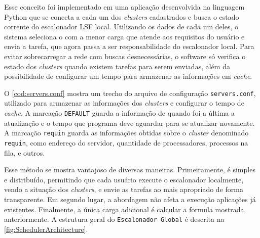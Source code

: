\documentclass[12pt]{report} %
\begin{document}
	    Esse conceito foi implementado em uma aplicação desenvolvida na linguagem Python que se conecta a cada um dos \textit{clusters} cadastrados e busca o estado corrente do escalonador LSF local.
	    Utilizando os dados de cada um deles, o sistema seleciona o com a menor carga que atende aos requisitos do usuário e envia a tarefa, que agora passa a ser responsabilidade do escalonador local.
	    Para evitar sobrecarregar a rede com buscas desnecessárias, o software só verifica o estado dos \textit{clusters} quando existem tarefas para serem enviadas, além da possibilidade de configurar um tempo para armazenar as informações em \textit{cache}.
	    
	    O \autoref{cod:servers.conf} mostra um trecho do arquivo de configuração \texttt{servers.conf}, utilizado para armazenar as informações dos \textit{clusters} e configurar o tempo de \textit{cache}. A marcação \texttt{DEFAULT} guarda a informação de quando foi a última a atualização e o tempo que programa deve aguardar para se atualizar novamente. A marcação \texttt{requin} guarda as informações obtidas sobre o \textit{cluster} denominado \texttt{requin}, como endereço do servidor, quantidade de processadores, processos na fila, e outros.
	    
 		

	    Esse método se mostra vantajoso de diversas maneiras.
	    Primeiramente, é simples e distribuído, permitindo que cada usuário execute o escalonador localmente, vendo a situação dos \textit{clusters}, e envie as tarefas ao mais apropriado de forma transparente.
	    Em segundo lugar, a abordagem não afeta a execução aplicações já existentes.
	    Finalmente, a única carga adicional é calcular a formula mostrada anteriormente.
	    A estrutura geral do \texttt{Escalonador Global} é descrita na \autoref{fig:SchedulerArchitecture}.
	    
\end{document}
